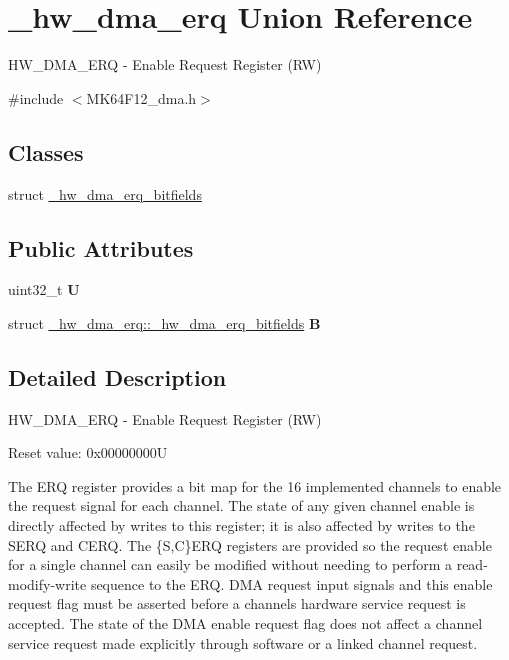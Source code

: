 \hypertarget{union__hw__dma__erq}{}\section{\+\_\+hw\+\_\+dma\+\_\+erq Union Reference}
\label{union__hw__dma__erq}


H\+W\+\_\+\+D\+M\+A\+\_\+\+E\+RQ -\/ Enable Request Register (RW)  




{\ttfamily \#include $<$M\+K64\+F12\+\_\+dma.\+h$>$}

\subsection*{Classes}
\begin{DoxyCompactItemize}
\item 
struct \hyperlink{struct__hw__dma__erq_1_1__hw__dma__erq__bitfields}{\+\_\+hw\+\_\+dma\+\_\+erq\+\_\+bitfields}
\end{DoxyCompactItemize}
\subsection*{Public Attributes}
\begin{DoxyCompactItemize}
\item 
uint32\+\_\+t {\bfseries U}\hypertarget{union__hw__dma__erq_add0056fa09f81027fbb240f06f816bb5}{}\label{union__hw__dma__erq_add0056fa09f81027fbb240f06f816bb5}

\item 
struct \hyperlink{struct__hw__dma__erq_1_1__hw__dma__erq__bitfields}{\+\_\+hw\+\_\+dma\+\_\+erq\+::\+\_\+hw\+\_\+dma\+\_\+erq\+\_\+bitfields} {\bfseries B}\hypertarget{union__hw__dma__erq_a9ac08a75eb0fd6048283e3e69e5f6559}{}\label{union__hw__dma__erq_a9ac08a75eb0fd6048283e3e69e5f6559}

\end{DoxyCompactItemize}


\subsection{Detailed Description}
H\+W\+\_\+\+D\+M\+A\+\_\+\+E\+RQ -\/ Enable Request Register (RW) 

Reset value\+: 0x00000000U

The E\+RQ register provides a bit map for the 16 implemented channels to enable the request signal for each channel. The state of any given channel enable is directly affected by writes to this register; it is also affected by writes to the S\+E\+RQ and C\+E\+RQ. The \{S,C\}E\+RQ registers are provided so the request enable for a single channel can easily be modified without needing to perform a read-\/modify-\/write sequence to the E\+RQ. D\+MA request input signals and this enable request flag must be asserted before a channel\textquotesingle{}s hardware service request is accepted. The state of the D\+MA enable request flag does not affect a channel service request made explicitly through software or a linked channel request. 

